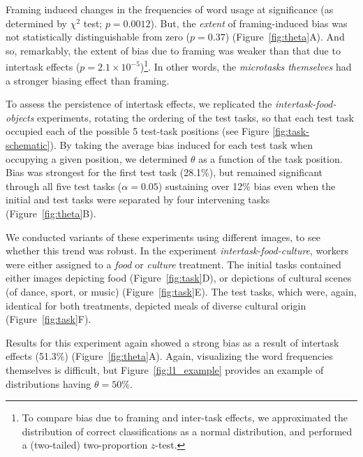 \documentclass{sigchi}
\begin{document}
Framing induced changes in the frequencies of 
word usage at significance 
(as determined by $\chi^2$ test; $p=0.0012$).  But, 
the \textit{extent} of framing-induced bias was not statistically 
distinguishable from zero ($p =0.37$) (Figure~\ref{fig:theta}A).
And so, remarkably, the extent of bias due to framing was weaker than that 
due to intertask effects ($p=2.1\times 10^{-5}$)\footnote{To compare bias
  due to framing and inter-task effects, we approximated the distribution
  of correct classifications as a normal distribution, and performed
a (two-tailed) two-proportion $z$-test.}.
In other words, the \textit{microtasks themselves}
had a stronger biasing effect than framing.

To assess the persistence of intertask effects, we replicated the 
\textit{intertask-food-objects} experiments, rotating the ordering of the
test tasks, so that each test task occupied each of the possible 5 
test-task positions (see Figure \ref{fig:task-schematic}).  
By taking the average bias induced for each test task when 
occupying a given position, we determined $\theta$ as a function of the 
task position.
Bias was strongest for the first test task (28.1\%), 
but remained significant through all five test tasks 
($\alpha=0.05$) sustaining over 12\% bias even when the initial and test 
tasks were separated by four intervening tasks (Figure~\ref{fig:theta}B).

We conducted variants of these experiments using different images, to see 
whether this trend was robust.  In the experiment 
\textit{intertask-food-culture},
workers were either assigned to a \textit{food} or \textit{culture} treatment.
The initial tasks contained either images 
depicting food (Figure~\ref{fig:task}D), or depictions of cultural scenes 
(of dance, sport, or music) (Figure~\ref{fig:task}E).  The test tasks, 
which 
were, again, identical for both treatments, depicted meals of diverse 
cultural origin
(Figure~\ref{fig:task}F).  

Results for this experiment again showed a 
strong bias as a result of intertask effects (51.3\%) 
(Figure~\ref{fig:theta}A).  Again, visualizing the word frequencies 
themselves is difficult, but Figure~\ref{fig:l1_example} provides an 
example of distributions having $\theta = 50\%$.
\end{document}
